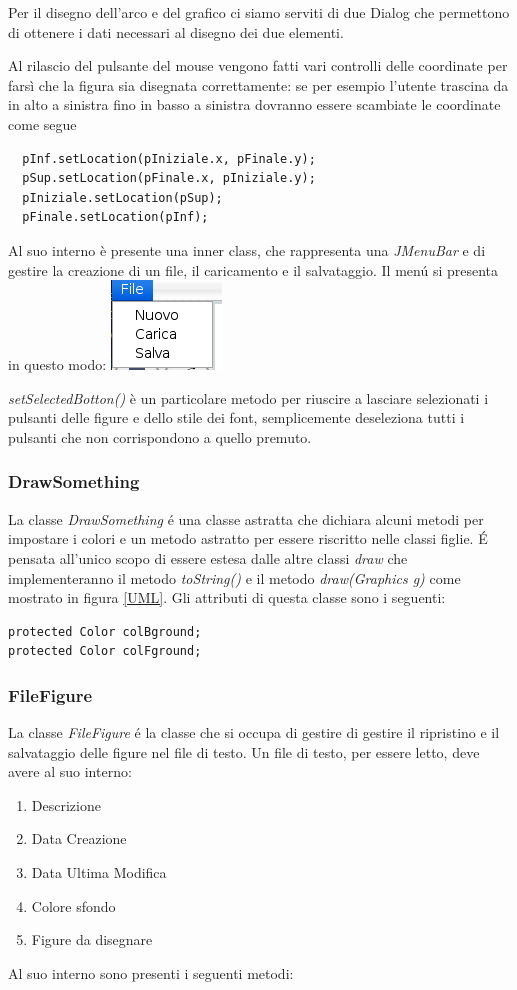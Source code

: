\documentclass[a4paper,12pt]{article}
\begin{document}
Per il disegno dell'arco e del grafico ci siamo serviti di due Dialog che permettono di ottenere i dati necessari al disegno dei due elementi.


Al rilascio del pulsante del mouse vengono fatti vari controlli delle coordinate per farsì che la figura sia disegnata correttamente: se per esempio l'utente trascina da in alto a sinistra fino in basso a sinistra dovranno essere scambiate le coordinate come segue
\begin{lstlisting}
  pInf.setLocation(pIniziale.x, pFinale.y);
  pSup.setLocation(pFinale.x, pIniziale.y);
  pIniziale.setLocation(pSup);
  pFinale.setLocation(pInf);
\end{lstlisting}
Al suo interno è presente una inner class, che rappresenta una \textit{JMenuBar} e di gestire la creazione di un file, il caricamento e il salvataggio. Il menú si presenta in questo modo:
\includegraphics{Immagini/menu.png}

\textit{setSelectedBotton()} è un particolare metodo per riuscire a lasciare selezionati i pulsanti delle figure e dello stile dei font, semplicemente deseleziona tutti i pulsanti che non corrispondono a quello premuto.

\subsubsection{DrawSomething}
La classe \textit{DrawSomething} é una classe astratta che dichiara alcuni metodi per impostare i colori e un metodo astratto per essere riscritto nelle classi figlie.
É pensata all'unico scopo di essere estesa dalle altre classi \textit{draw} che implementeranno il metodo \textit{toString()} e il metodo \textit{draw(Graphics g)} come mostrato in figura \ref{UML}.
Gli attributi di questa classe sono i seguenti:
\begin{lstlisting}
protected Color colBground;
protected Color colFground;
\end{lstlisting}

\subsubsection{FileFigure}
La classe \textit{FileFigure} é la classe che si occupa di gestire di gestire il ripristino e il salvataggio delle figure nel file di testo.
Un file di testo, per essere letto, deve avere al suo interno:
\begin{enumerate}
\item Descrizione
\item Data Creazione
\item Data Ultima Modifica
\item Colore sfondo
\item Figure da disegnare
\end{enumerate}
Al suo interno sono presenti i seguenti metodi:
\end{document}
